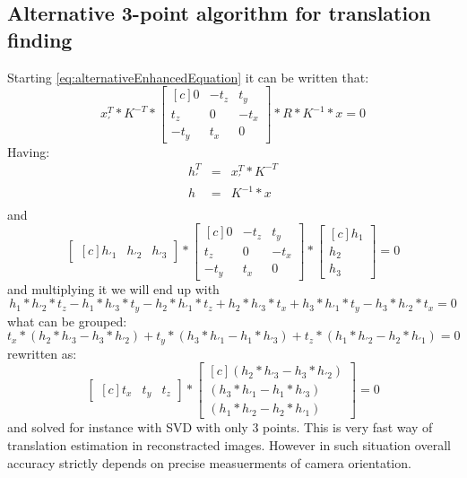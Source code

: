 \subsection{Alternative 3-point algorithm for translation finding}
Starting \ref{eq:alternativeEnhancedEquation} it can be written that:
\begin{equation} \label{eq:alternative3point}
{x}_{'}^{T} * K^{-T} * \begin{bmatrix*}[c]
 0 & -t_{z} & t_{y}\\
 t_{z} & 0 & -t_{x}\\
-t_{y} & t_{x} & 0 
\end{bmatrix*} * R * K^{-1} * x = 0
\end{equation}
Having:
\begin{equation} \label{eq:leftRelative}
\begin{array}{lcl}
h_{'}^{T} &=& {x}_{'}^{T} * K^{-T} \\
h &=& K^{-1} * x \\
\end{array}
\end{equation}
and 
\begin{equation} \label{eq:alternative3point}
\begin{bmatrix*}[c]
h_{'1} & h_{'2} & h_{'3}
\end{bmatrix*}
* \begin{bmatrix*}[c]
 0 & -t_{z} & t_{y}\\
 t_{z} & 0 & -t_{x}\\
-t_{y} & t_{x} & 0 
\end{bmatrix*} 
* \begin{bmatrix*}[c]
h_{1} \\
h_{2} \\
h_{3}
\end{bmatrix*}
= 0
\end{equation}
and multiplying it we will end up with
\begin{equation} \label{eq:alternative3point}
h_{1}*h_{'2}*t_{z} - h_{1}*h_{'3}*t_{y} - h_{2}*h_{'1}*t_{z} + h_{2}*h_{'3}*t_{x} + h_{3}*h_{'1}*t_{y} - h_{3}*h_{'2}*t_{x}
= 0
\end{equation}
what can be grouped:
\begin{equation}
t_{x} * (h_{2}*h_{'3} - h_{3}*h_{'2}) + t_{y} * (h_{3}*h_{'1} - h_{1}*h_{'3}) + t_{z} * (h_{1}*h_{'2} - h_{2}*h_{'1}) = 0
\end{equation}
rewritten as:
\begin{equation} \label{eq:translation3point}
\begin{bmatrix*}[c]
t_{x} &
t_{y} &
t_{z}
\end{bmatrix*} * \begin{bmatrix*}[c]
(h_{2}*h_{'3} - h_{3}*h_{'2}) \\ 
(h_{3}*h_{'1} - h_{1}*h_{'3}) \\
(h_{1}*h_{'2} - h_{2}*h_{'1}) 
\end{bmatrix*} 
= 0
\end{equation}
and solved for instance with SVD with only 3 points. This is very fast way of translation estimation in reconstracted images. However in such situation overall accuracy strictly depends on precise measuerments of camera orientation.

